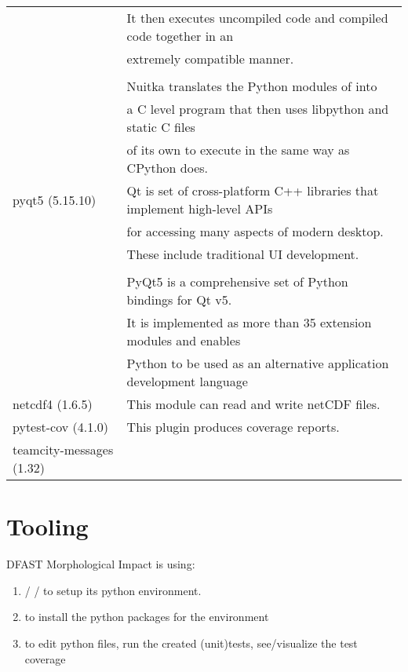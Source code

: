\begin{longtable}{|l|l|}
	\\ & It then executes uncompiled code and compiled code together in an
	\\ & extremely compatible manner.
	\\ &
	\\ & Nuitka translates the Python modules of \dfastmi into
	\\ & a C level program that then uses libpython and static C files  
	\\ & of its own to execute in the same way as CPython does. \\ \hline
	pyqt5 (5.15.10)               & Qt is set of cross-platform C++ libraries that implement high-level APIs 
	\\ & for accessing many aspects of modern desktop. 
	\\ & These include traditional UI development.
	\\ &
	\\ & PyQt5 is a comprehensive set of Python bindings for Qt v5. 
	\\ & It is implemented as more than 35 extension modules and enables 
	\\ & Python to be used as an alternative application development language \\ \hline
	netcdf4 (1.6.5)               & This module can read and write netCDF files. \\ \hline
	pytest-cov (4.1.0)            & This plugin produces coverage reports. \\ \hline
	teamcity-messages (1.32)      & \\ \hline
\end{longtable}

\section{Tooling}
DFAST Morphological Impact is using:
\begin{enumerate}
\item {} /  / to setup its python environment. 
\item {} to install the python packages for the environment
\item {} to edit python files, run the created (unit)tests, see/visualize the test coverage
\end{enumerate}

